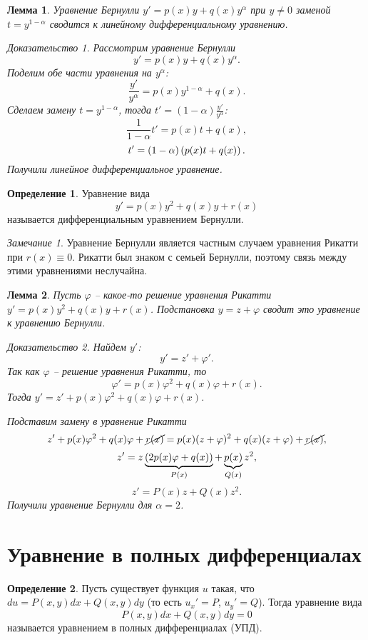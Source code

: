 \documentclass[a5paper, 10pt]{article}
\theoremstyle{definition}
\newtheorem{Def}{Определение}
\theoremstyle{plain}
\newtheorem{Lem}{Лемма}
\theoremstyle{remark}
\newtheorem*{Note}{Замечание}
\newtheorem*{Proof}{Доказательство}
\begin{document}
	\begin{Lem}
		Уравнение Бернулли $y' = p(x) y + q(x) y^{\alpha}$ при $y\neq0$ заменой $t = y^{1-\alpha}$ сводится к линейному дифференциальному уравнению.
		\begin{Proof}
			Рассмотрим уравнение Бернулли 
			\[
			y' = p(x) y + q(x) y^{\alpha}.
			\]
			Поделим обе части уравнения на $y^{\alpha}$:
			\[
			\frac{y'}{y^\alpha} = p(x) y^{1-\alpha} + q(x).
			\]
			Сделаем замену $t = y^{1-\alpha}$, тогда $t' = (1-\alpha)\frac{y'}{y^{\alpha}}$:
			\[
			\frac{1}{1-\alpha} t' = p(x) t + q(x),
			\]
			\[
			t' = \left(1-\alpha\right)\left(p(x) t + q(x)\right).
			\]
			Получили линейное дифференциальное уравнение.
		\end{Proof}
	\end{Lem}
	
	\begin{Def}
		Уравнение вида 
		\begin{equation}
			y' = p(x) y^2 + q(x) y + r(x)
		\end{equation}
		называется дифференциальным уравнением Бернулли.
	\end{Def}
	\begin{Note}
		Уравнение Бернулли является частным случаем уравнения Рикатти при $r(x)\equiv 0$. Рикатти был знаком с семьей Бернулли, поэтому связь между этими уравнениями неслучайна.
	\end{Note}
	
	\begin{Lem}
		Пусть $\varphi$ -- какое-то решение уравнения Рикатти $y' = p(x) y^2 + q(x) y + r(x)$. Подстановка $y = z + \varphi$ сводит это уравнение к уравнению Бернулли.
		\begin{Proof}
			Найдем $y'$:
			\[
			y' = z' + \varphi'.
			\]
			Так как $\varphi$ -- решение уравнения Рикатти, то 
			\[
			\varphi' = p(x) \varphi^2 + q(x) \varphi + r(x).
			\]
			Тогда $y' = z' + p(x) \varphi^2 + q(x) \varphi + r(x)$.
			
			Подставим замену в уравнение Рикатти
			\[
				z' + p(x) \varphi^2 + q(x) \varphi + \cancel{r(x)} = p(x) (z+\varphi)^2 + q(x) (z+\varphi) + \cancel{r(x)},
			\]
			\[
				z' = z \underbrace{\left(2p(x)\varphi + q(x)\right)}_{P(x)} + \underbrace{p(x)}_{Q(x)} z^2,
			\]
			\[
				z' = P(x) z + Q(x) z^2.
			\]
			Получили уравнение Бернулли для $\alpha=2$.
		\end{Proof}
	\end{Lem}
	
	\section[УПД]{Уравнение в полных дифференциалах}
	\begin{Def}
		Пусть существует функция $u$ такая, что $du = P(x,y)dx + Q(x,y)dy$ (то есть $u_x'=P$, $u_y'=Q$). Тогда уравнение вида 
		\begin{equation}
			P(x,y)dx + Q(x,y)dy = 0
		\end{equation}
		называется уравнением в полных дифференциалах (\textsc{УПД}).
	\end{Def}
	
\end{document}
